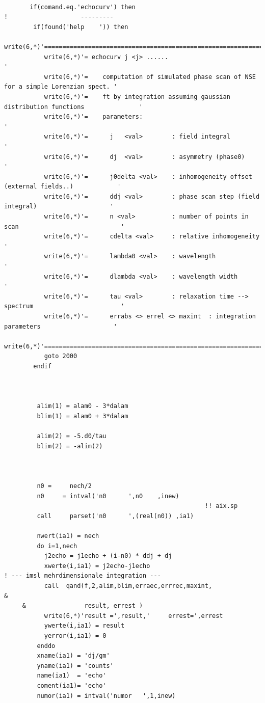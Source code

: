 \documentclass[11pt,fleqn]{book} %
\begin{document}
\begin{verbatim}

       if(comand.eq.'echocurv') then
!                    ---------
        if(found('help    ')) then 
           write(6,*)'=============================================================================='
           write(6,*)'= echocurv j <j> ......                                                       '
           write(6,*)'=    computation of simulated phase scan of NSE for a simple Lorenzian spect. '
           write(6,*)'=    ft by integration assuming gaussian distribution functions               '
           write(6,*)'=    parameters:                                                              '
           write(6,*)'=      j   <val>        : field integral                                      '
           write(6,*)'=      dj  <val>        : asymmetry (phase0)                                  '
           write(6,*)'=      j0delta <val>    : inhomogeneity offset (external fields..)            '
           write(6,*)'=      ddj <val>        : phase scan step (field integral)                    '
           write(6,*)'=      n <val>          : number of points in scan                            '
           write(6,*)'=      cdelta <val>     : relative inhomogeneity                              '
           write(6,*)'=      lambda0 <val>    : wavelength                                          '
           write(6,*)'=      dlambda <val>    : wavelength width                                    '
           write(6,*)'=      tau <val>        : relaxation time --> spectrum                        '
           write(6,*)'=      errabs <> errel <> maxint  : integration parameters                    '
           write(6,*)'=============================================================================='
           goto 2000
        endif



         alim(1) = alam0 - 3*dalam
         blim(1) = alam0 + 3*dalam

         alim(2) = -5.d0/tau
         blim(2) = -alim(2)



         n0 =     nech/2
         n0     = intval('n0      ',n0    ,inew)
                                                       !! aix.sp
         call     parset('n0      ',(real(n0)) ,ia1)

         nwert(ia1) = nech
         do i=1,nech
           j2echo = j1echo + (i-n0) * ddj + dj
           xwerte(i,ia1) = j2echo-j1echo
! --- imsl mehrdimensionale integration ---
           call  qand(f,2,alim,blim,erraec,errrec,maxint,               &
     &                result, errest )
           write(6,*)'result =',result,'     errest=',errest
           ywerte(i,ia1) = result
           yerror(i,ia1) = 0
         enddo
         xname(ia1) = 'dj/gm'
         yname(ia1) = 'counts'
         name(ia1)  = 'echo'
         coment(ia1)= 'echo'
         numor(ia1) = intval('numor   ',1,inew)
         


\end{verbatim}
\end{document}
